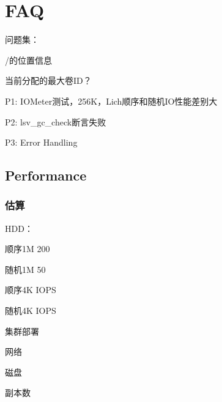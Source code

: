 \chapter{FAQ}

问题集：
\begin{enumbox}
\item /的位置信息
\item 当前分配的最大卷ID？
\end{enumbox}

P1: IOMeter测试，256K，Lich顺序和随机IO性能差别大

P2: lsv\_gc\_check断言失败

P3: Error Handling

\section{Performance}

\subsection{估算}

HDD：
\begin{itembox}
\item 顺序1M 200
\item 随机1M 50
\item 顺序4K IOPS
\item 随机4K IOPS
\end{itembox}

集群部署
\begin{enumbox}
\item 网络
\item 磁盘
\item 副本数
\end{enumbox}
